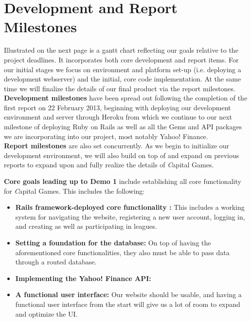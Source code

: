 \section{Development and Report Milestones}

Illustrated on the next page is a gantt chart reflecting our goals relative
to the project deadlines. It incorporates both core development and report items.
For our initial stages we focus on environment and platform set-up (i.e.
deploying a development webserver) and the initial, core code implementation. At
the same time we will finalize the details of our final product via the report
milestones. \\ 

{\bfseries Development milestones} have been spread out following the completion 
of the first report on 22 February 2013, beginning with deploying our development
 environment and server through Heroku from which we continue to our next 
 milestone of deploying Ruby on Rails as well as all the Gems and API packages we are incorporating into our project, most notably Yahoo! Finance. \\

{\bfseries Report milestones} are also set concurrently. As we begin to initialize
our development environment, we will also build on top of and expand on previous
reports to expand upon and fully realize the details of {\textit Capital Games}.

{\bfseries Core goals leading up to Demo 1} include establishing all core 
functionality for {\textit Capital Games}. This includes the following:
\begin{itemize}
\item {\bfseries Rails framework-deployed core functionality :} This
includes a working system for navigating the website, registering a new
user account, logging in, and creating as well as participating in leagues.
\item {\bfseries Setting a foundation for the database: } On top of having 
the aforementioned core functionalities, they also must be able to pass
data through a routed database.  
\item {\bfseries Implementing the Yahoo! Finance API: }
\item {\bfseries A functional user interface:} Our website should be usable, 
and having a functional user interface from the start will give us a lot of
room to expand and optimize the UI. \\
\end{itemize}


